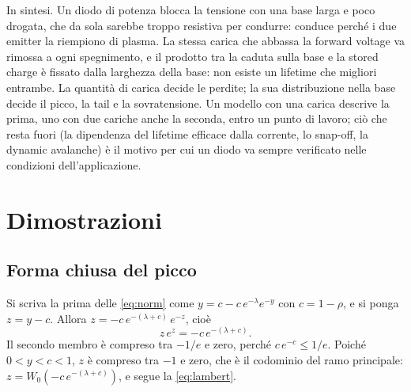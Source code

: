 \documentclass[10pt,a4paper]{scrartcl}
\begin{document}
In sintesi. Un diodo di potenza blocca la tensione con una base larga e poco drogata, che da sola sarebbe troppo resistiva per condurre: conduce perché i due emitter la riempiono di plasma. La stessa carica che abbassa la forward voltage va rimossa a ogni spegnimento, e il prodotto tra la caduta sulla base e la stored charge è fissato dalla larghezza della base: non esiste un lifetime che migliori entrambe. La quantità di carica decide le perdite; la sua distribuzione nella base decide il picco, la tail e la sovratensione. Un modello con una carica descrive la prima, uno con due cariche anche la seconda, entro un punto di lavoro; ciò che resta fuori (la dipendenza del lifetime efficace dalla corrente, lo snap-off, la dynamic avalanche) è il motivo per cui un diodo va sempre verificato nelle condizioni dell'applicazione.
\appendix
\section{Dimostrazioni}
\label{app:proofs}
\subsection{Forma chiusa del picco}
\label{app:lambert}
Si scriva la prima delle \eqref{eq:norm} come $y = c - c\,e^{-\lambda}e^{-y}$ con $c = 1-\rho$, e si ponga $z = y - c$. Allora $z = -c\,e^{-(\lambda+c)}\,e^{-z}$, cioè
\begin{equation}
z\,e^{z} = -c\,e^{-(\lambda+c)} .
\end{equation}
Il secondo membro è compreso tra $-1/e$ e zero, perché $c\,e^{-c} \leq 1/e$. Poiché $0 < y < c < 1$, $z$ è compreso tra $-1$ e zero, che è il codominio del ramo principale: $z = W_0(-c\,e^{-(\lambda+c)})$, e segue la \eqref{eq:lambert}.
\end{document}
